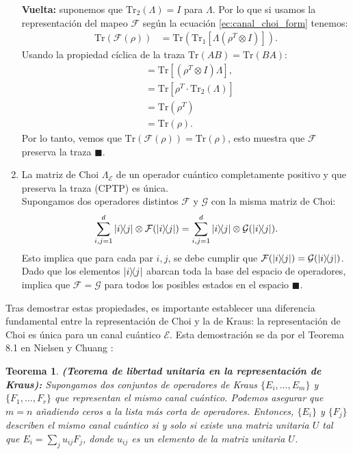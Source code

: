 \documentclass[letterpaper,12pt]{thesisECFM}
\theoremstyle{plain}
\newtheorem{thm}{Teorema}[section]
\theoremstyle{definition}
\theoremstyle{definition}
\theoremstyle{remark}
\newcommand{\1}{\mathbb{1}}
\begin{document}
\begin{enumerate}
    \textbf{Vuelta:} suponemos que $\text{Tr}_2(\Lambda) = I$ para $\Lambda$. Por lo que si usamos la representación del mapeo $\mathcal{F}$ según la ecuación \ref{ec:canal_choi_form} tenemos:
    \begin{align}
        \text{Tr} (\mathcal{F}(\rho)) &= \text{Tr}( \text{Tr}_1 [ \Lambda ( \rho^{T} \otimes I)]).
    \end{align}
    Usando la propiedad cíclica de la traza $\text{Tr}(AB) = \text{Tr}(BA)$:
    \begin{align}
        &= \text{Tr}[(\rho^T \otimes I) \Lambda], \\
        &= \text{Tr}[\rho^T \cdot \text{Tr}_2(\Lambda)]\\
        &= \text{Tr}(\rho^T)\\
        &=\text{Tr}(\rho).
    \end{align}
    Por lo tanto, vemos que $\text{Tr}(\mathcal{F}(\rho))= \text{Tr}(\rho)$, esto muestra que $\mathcal{F}$ preserva la traza $\blacksquare$.

    \item La matriz de Choi $\Lambda_{\mathcal{E}}$ de un operador cuántico completamente positivo y que preserva la traza (CPTP)  es única. \\
    Supongamos dos operadores distintos $\mathcal{F}$ y $\mathcal{G}$ con la misma matriz de Choi:
    \begin{equation}
       \sum_{i,j=1}^{d} \ketbra{i}{j} \otimes \mathcal{F}(\ketbra{i}{j}) =  \sum_{i,j=1}^{d} \ketbra{i}{j} \otimes \mathcal{G}(\ketbra{i}{j}).
    \end{equation}
    Esto implica que para cada par $i, j$, se debe cumplir que $\mathcal{F}(\ketbra{i}{j}) = \mathcal{G}(\ketbra{i}{j})$. Dado que los elementos $\ketbra{i}{j}$ abarcan toda la base del espacio de operadores, implica que $\mathcal{F} = \mathcal{G}$ para todos los posibles estados en el espacio $\blacksquare$.
\end{enumerate}

Tras demostrar estas propiedades, es importante establecer una diferencia fundamental entre la representación de Choi y la de Kraus: la representación de Choi es única para un canal cuántico $\mathcal{E}$. Esta demostración se da por el Teorema 8.1 en Nielsen y Chuang \cite{nielsen_chuang_2011}: 

\begin{thm}\textbf{(Teorema de libertad unitaria en la representación de Kraus):}  Supongamos dos conjuntos de operadores de Kraus $\{E_i, \ldots, E_m\}$ y $\{F_1, \ldots, F_r\}$ que representan el mismo canal cuántico. Podemos asegurar que $m = n$ añadiendo ceros a la lista más corta de operadores. Entonces, $\{E_i\}$ y $\{F_j\}$ describen el mismo canal cuántico si y solo si existe una matriz unitaria $U$ tal que $E_i = \sum_j u_{ij} F_j$, donde $u_{ij}$ es un elemento de la matriz unitaria $U$.
\end{thm}
\end{document}
